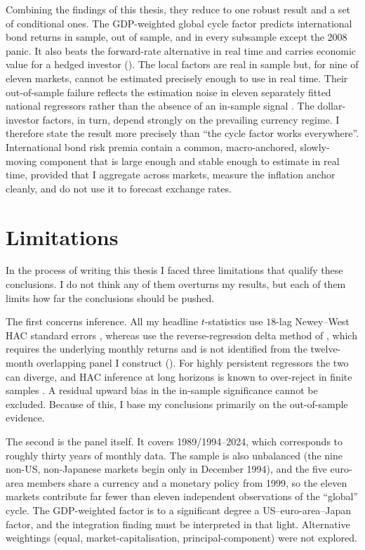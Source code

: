 \bigskip
Combining the findings of this thesis, they reduce to one robust
result and a set of conditional ones. The GDP-weighted global cycle factor
predicts international bond returns in sample, out of sample, and in every
subsample except the 2008 panic. It also beats the forward-rate
alternative in real time and carries economic value for a hedged investor
(). The local factors are real in sample but, for nine of
eleven markets, cannot be estimated precisely enough to use in real time. Their out-of-sample failure reflects the estimation noise in eleven
separately fitted national regressors rather than the absence of an
in-sample signal \citep{cochrane2006}.
The dollar-investor factors, in turn, depend strongly on the prevailing
currency regime. I therefore state the result more precisely than ``the
cycle factor works everywhere''. International bond risk premia contain a common,
macro-anchored, slowly-moving component that is large enough and stable
enough to estimate in real time, provided that I aggregate across markets,
measure the inflation anchor cleanly, and do not use it to forecast
exchange rates.

\section{Limitations}
\label{sec:disc-limitations}

In the process of writing this thesis I faced three limitations that qualify
these conclusions. I do not think any of them overturns my results, but
each of them limits how far the conclusions should be pushed.

\bigskip
The first concerns inference. All my headline $t$-statistics use $18$-lag Newey--West HAC standard errors
\citep{neweywest1987}, whereas \citet{cieslak2015} use the
reverse-regression delta method of \citet{weiwright2013}, which requires the
underlying monthly returns and is not identified from the twelve-month
overlapping panel I construct (). For highly
persistent regressors the two can diverge, and HAC inference at long
horizons is known to over-reject in finite samples \citep{hodrick1992}. A
residual upward bias in the in-sample significance cannot be excluded. Because
of this, I base my conclusions primarily on the out-of-sample evidence.

\bigskip
The second is the panel itself. It covers
1989/1994--2024, which corresponds to roughly thirty years of monthly data.
The sample is also unbalanced (the nine non-US, non-Japanese markets begin only
in December 1994), and the five euro-area members share a currency and a
monetary policy from 1999, so the eleven markets
contribute far fewer than eleven independent observations of the ``global''
cycle. The GDP-weighted
factor is to a significant degree a US--euro-area--Japan factor, and the
integration finding must be interpreted in that light. Alternative weightings
(equal, market-capitalisation, principal-component) were not explored.

